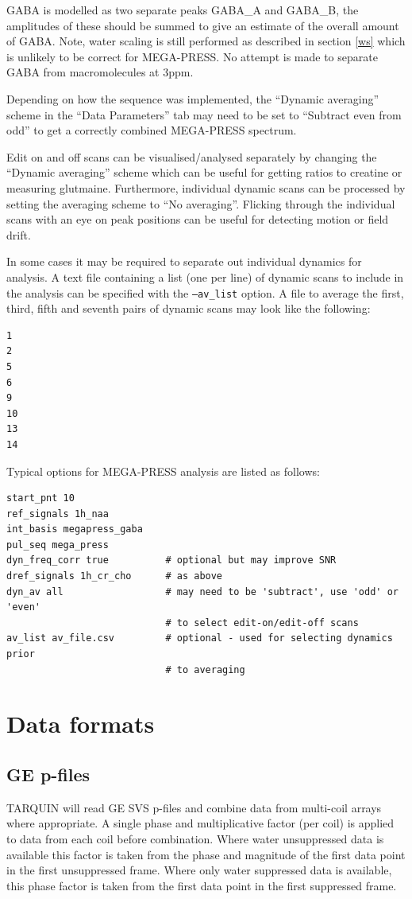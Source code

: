 \documentclass[a4paper,12pt]{article}
\begin{document}
GABA is modelled as two separate peaks GABA\_A and GABA\_B, the amplitudes of these should be summed to give an estimate of the overall amount of GABA.  Note, water scaling is still performed as described in section \ref{ws} which is unlikely to be correct for MEGA-PRESS. No attempt is made to separate GABA from macromolecules at 3ppm.

Depending on how the sequence was implemented, the ``Dynamic averaging'' scheme in the ``Data Parameters'' tab may need to be set to ``Subtract even from odd'' to get a correctly combined MEGA-PRESS spectrum.

Edit on and off scans can be visualised/analysed separately by changing the ``Dynamic averaging'' scheme which can be useful for getting ratios to creatine or measuring glutmaine. Furthermore, individual dynamic scans can be processed by setting the averaging scheme to ``No averaging''. Flicking through the individual scans with an eye on peak positions can be useful for detecting motion or field drift.

In some cases it may be required to separate out individual dynamics for analysis. A text file containing a list (one per line) of dynamic scans to include in the analysis can be specified with the \texttt{---av\_list} option. A file to average the first, third, fifth and seventh pairs of dynamic scans may look like the following:
\begin{verbatim}
1
2
5
6
9
10
13
14
\end{verbatim}

Typical options for MEGA-PRESS analysis are listed as follows:

\noindent\hrulefill
\begin{verbatim}
start_pnt 10
ref_signals 1h_naa
int_basis megapress_gaba
pul_seq mega_press
dyn_freq_corr true          # optional but may improve SNR
dref_signals 1h_cr_cho      # as above
dyn_av all                  # may need to be 'subtract', use 'odd' or 'even'
                            # to select edit-on/edit-off scans
av_list av_file.csv         # optional - used for selecting dynamics prior
                            # to averaging
\end{verbatim}
\noindent\hrulefill

\section{Data formats}
\subsection{GE p-files}
TARQUIN will read GE SVS p-files and combine data from multi-coil arrays where appropriate. A single phase and multiplicative factor (per coil) is applied to data from each coil before combination. Where water unsuppressed data is available this factor is taken from the phase and magnitude of the first data point in the first unsuppressed frame. Where only water suppressed data is available, this phase factor is taken from the first data point in the first suppressed frame.
\end{document}
